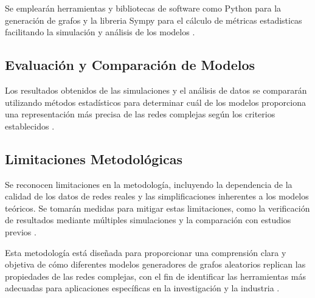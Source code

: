 Se emplearán herramientas y bibliotecas de software como Python para la generación de grafos y la libreria Sympy para el cálculo de métricas estadisticas facilitando la simulación y análisis de los modelos .

\subsection{Evaluación y Comparación de Modelos}

Los resultados obtenidos de las simulaciones y el análisis de datos se compararán utilizando métodos estadísticos para determinar cuál de los modelos proporciona una representación más precisa de las redes complejas según los criterios establecidos .

\subsection{Limitaciones Metodológicas}

Se reconocen limitaciones en la metodología, incluyendo la dependencia de la calidad de los datos de redes reales y las simplificaciones inherentes a los modelos teóricos. Se tomarán medidas para mitigar estas limitaciones, como la verificación de resultados mediante múltiples simulaciones y la comparación con estudios previos .

Esta metodología está diseñada para proporcionar una comprensión clara y objetiva de cómo diferentes modelos generadores de grafos aleatorios replican las propiedades de las redes complejas, con el fin de identificar las herramientas más adecuadas para aplicaciones específicas en la investigación y la industria .
